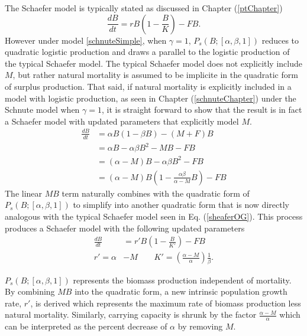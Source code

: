 The Schaefer model is typically stated as discussed in Chapter (\ref{ptChapter})
\begin{equation}
\frac{dB}{dt} = r B \left(1-\frac{B}{K}\right) - FB. \label{sheaferOG}
\end{equation}
However under model \ref{schnuteSimple}, when $\gamma=1$, 
$P_s(B;[\alpha, \beta, 1])$ reduces to quadratic logistic production and 
draws a parallel to the logistic production of the typical Schaefer model. 
The typical Schaefer model does not explicitly include $M$, but rather natural 
mortality is assumed to be implicite in the quadratic form of surplus production. 
That said, if natural mortality is explicitly included in a model with logistic 
production, as seen in Chapter (\ref{schnuteChapter}) under the Schnute model 
when $\gamma=1$, it is straight forward to show that the result is in fact a 
Schaefer model with updated parameters that explicitly model $M$.
\begin{align}
\frac{dB}{dt} &= \alpha B \left(1-\beta B\right) - (M+F)B \nonumber\\%
&= \alpha B -\alpha\beta B^2 - M B - F B \nonumber\\
&= (\alpha-M)B -\alpha\beta B^2 - F B \nonumber\\
&= (\alpha-M)B \left(1 - \frac{\alpha\beta}{\alpha-M}B\right) - F B
\end{align}
The linear $MB$ term naturally combines with the quadratic form of 
$P_s(B;[\alpha, \beta, 1])$ to simplify into another quadratic 
form that is now directly analogous with the typical Schaefer model seen in 
Eq. (\ref{sheaferOG}). This process produces a Schaefer model with 
the following updated parameters
\begin{align}
\frac{dB}{dt} &= r' B \left(1-\frac{B}{K'}\right) - FB\\
r'=\alpha&-M ~~~~~~~~~ K'=\left(\frac{\alpha-M}{\alpha}\right)\frac{1}{\beta}.
\end{align}
%
%  


$P_s(B;[\alpha, \beta, 1])$ represents the biomass production independent of 
mortality. By combining $MB$ into the quadratic form, a new intrinsic 
population growth rate, $r'$, is derived which represents the maximum rate of 
biomass production less natural mortality. %
Similarly, 
carrying capacity is shrunk by the factor $\frac{\alpha-M}{\alpha}$ 
which can be interpreted as the percent decrease of $\alpha$ by removing $M$.

